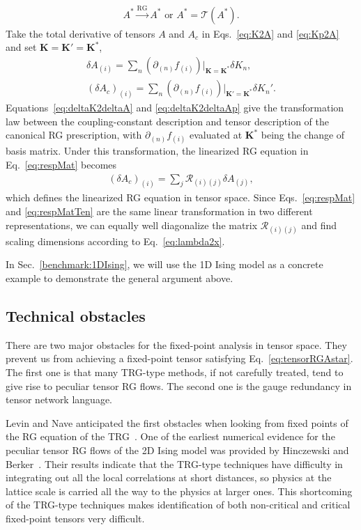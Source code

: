 \documentclass[aps,prr,reprint,superscriptaddress,floatfix]{revtex4-2}
\begin{document}
%
\begin{align}\label{eq:tensorRGAstar}
    A^* \xrightarrow{\text{RG}} A^* \text{ or }A^* = \mathcal{T}\left(A^* \right).
\end{align}
%
Take the total derivative of tensors $A$ and $A_c$ in Eqs.~\eqref{eq:K2A} and \eqref{eq:Kp2A} and set $\mathbf{K} = \mathbf{K}' = \mathbf{K}^*$, 
%
\begin{align}
    \delta A_{(i)} = \sum_n \left(\partial_{(n)}
    f_{(i)}\right)\Bigr|_{\mathbf{K} = \mathbf{K}^*} \delta K_n,
    \label{eq:deltaK2deltaA} \\
    \left(\delta A_c \right)_{(i)} = \sum_n \left(\partial_{(n)}
    f_{(i)}\right)\Bigr|_{\mathbf{K}' = \mathbf{K}^*} \delta
    K_n'.\label{eq:deltaK2deltaAp}
\end{align}
%
Equations~\eqref{eq:deltaK2deltaA} and \eqref{eq:deltaK2deltaAp} give the transformation law between the coupling-constant description and tensor description of the canonical RG prescription, with $\partial_{(n)}f_{(i)}$ evaluated at $\mathbf{K}^*$ being the change of basis matrix.
Under this transformation, the linearized RG equation in Eq.~\eqref{eq:respMat} becomes
%
\begin{align}\label{eq:respMatTen}
    \left(\delta A_c\right)_{(i)} = \sum_j
    \mathcal{R}_{(i)(j)} \delta A_{(j)},
\end{align}
%
which defines the linearized RG equation in tensor space.
Since Eqs.~\eqref{eq:respMat} and \eqref{eq:respMatTen} are the same linear transformation in two different representations, we can equally well diagonalize the matrix $\mathcal{R}_{(i)(j)}$ and find scaling dimensions according to Eq.~\eqref{eq:lambda2x}. 
%

In Sec.~\ref{benchmark:1DIsing}, we will use the 1D Ising model as a
concrete example to demonstrate the general argument above.
%

\subsection{Technical obstacles\label{sec:obstacles}}
There are two major obstacles for the fixed-point analysis in tensor space. 
They prevent us from achieving a fixed-point tensor satisfying Eq.~\eqref{eq:tensorRGAstar}.
The first one is that many TRG-type methods, if not carefully treated, tend to give rise to peculiar tensor RG flows.
The second one is the gauge redundancy in tensor network language.
%

Levin and Nave anticipated the first obstacles when looking from fixed points of the RG equation of the TRG~\cite{LevinTalk}.
One of the earliest numerical evidence for the peculiar tensor RG flows of the 2D Ising model was provided by Hinczewski and Berker~\cite{Berker2008}. 
Their results indicate that the TRG-type techniques have difficulty in integrating out all the local correlations at short distances, so physics at the lattice scale is carried all the way to the physics at larger ones. 
This shortcoming of the TRG-type techniques makes identification of both non-critical and critical fixed-point tensors very difficult.
%
\end{document}
